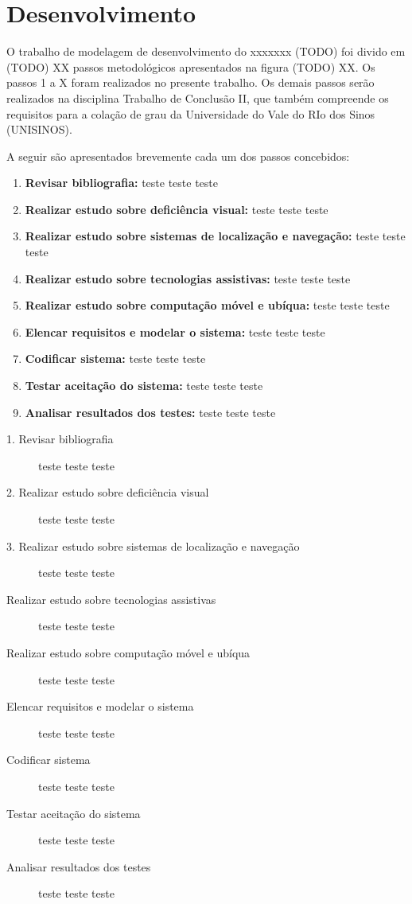 \documentclass[english,brazilian]{UNISINOSmonografia}
\begin{document}
	\section{Desenvolvimento}
O trabalho de modelagem de desenvolvimento do xxxxxxx (TODO) foi divido em (TODO) XX passos metodológicos apresentados na figura (TODO) XX. Os passos 1 a X foram realizados no presente trabalho. Os demais passos serão realizados na disciplina Trabalho de Conclusão II, que também compreende os requisitos para a colação de grau da Universidade do Vale do RIo dos Sinos (UNISINOS).

A seguir são apresentados brevemente cada um dos passos concebidos:

\begin{enumerate}
	\item \textbf{Revisar bibliografia:} teste teste teste
    \item \textbf{Realizar estudo sobre deficiência visual:} teste teste teste
    \item \textbf{Realizar estudo sobre sistemas de localização e navegação:} teste teste teste
    \item \textbf{Realizar estudo sobre tecnologias assistivas:} teste teste teste
    \item \textbf{Realizar estudo sobre computação móvel e ubíqua:} teste teste teste
    \item \textbf{Elencar requisitos e modelar o sistema:} teste teste teste
    \item \textbf{Codificar sistema:} teste teste teste
	\item \textbf{Testar aceitação do sistema:} teste teste teste	
	\item \textbf{Analisar resultados dos testes:} teste teste teste
\end{enumerate}

\begin{description}
	\item [1. Revisar bibliografia] teste teste teste
    \item [2. Realizar estudo sobre deficiência visual] teste teste teste
    \item [3. Realizar estudo sobre sistemas de localização e navegação] teste teste teste
    \item [Realizar estudo sobre tecnologias assistivas] teste teste teste
    \item [Realizar estudo sobre computação móvel e ubíqua] teste teste teste
    \item [Elencar requisitos e modelar o sistema] teste teste teste
    \item [Codificar sistema] teste teste teste
	\item [Testar aceitação do sistema] teste teste teste	
	\item [Analisar resultados dos testes] teste teste teste
\end{description}
\end{document}
